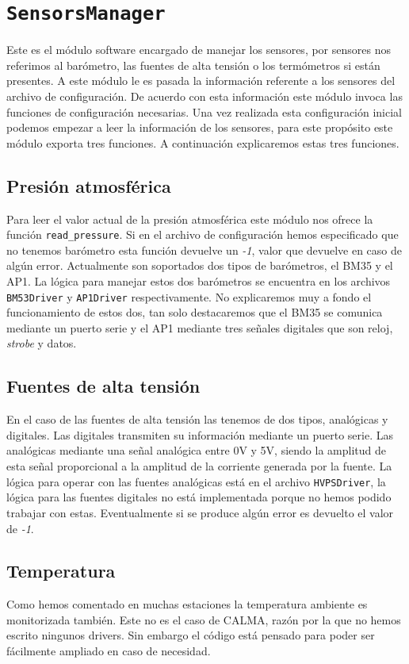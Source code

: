 \section{\texttt{SensorsManager}}
	Este es el módulo software encargado de manejar los sensores, por sensores nos referimos al barómetro, las fuentes de alta tensión o los
	termómetros si están presentes. A este módulo le es pasada la información referente a los sensores del archivo de configuración. De acuerdo
	con esta información este módulo invoca las funciones de configuración necesarias. Una vez realizada esta configuración inicial podemos
	empezar a leer la información de los sensores, para este propósito este módulo exporta tres funciones. A continuación explicaremos estas tres
	funciones.
	\subsection{Presión atmosférica}
		Para leer el valor actual de la presión atmosférica este módulo nos ofrece la función \texttt{read\_pressure}. Si en el archivo de
		configuración hemos especificado que no tenemos barómetro esta función devuelve un \emph{-1}, valor que devuelve en caso de algún
		error. Actualmente son soportados dos tipos de barómetros, el BM35 y el AP1. La lógica para manejar estos dos barómetros
		se encuentra en los archivos \texttt{BM53Driver} y \texttt{AP1Driver} respectivamente. No explicaremos muy a fondo el funcionamiento
		de estos dos, tan solo destacaremos que el BM35 se comunica mediante un puerto serie y el AP1 mediante tres señales digitales que son
		reloj, \emph{strobe} y datos.
	\subsection{Fuentes de alta tensión}
		En el caso de las fuentes de alta tensión las tenemos de dos tipos, analógicas y digitales. Las digitales transmiten su información
		mediante un puerto serie. Las analógicas mediante una señal analógica entre 0V y 5V, siendo la amplitud de esta señal proporcional a
		la amplitud de la corriente generada por la fuente. La lógica para operar con las fuentes analógicas está en el archivo
		\texttt{HVPSDriver}, la lógica para las fuentes digitales no está implementada porque no hemos podido trabajar con estas.
		Eventualmente si se produce algún error es devuelto el valor de \emph{-1}.
	\subsection{Temperatura}
		Como hemos comentado en muchas estaciones la temperatura ambiente es monitorizada también. Este no es el caso de CALMA, razón por la
		que no hemos escrito ningunos drivers. Sin embargo el código está pensado para poder ser fácilmente ampliado en caso de necesidad. 

